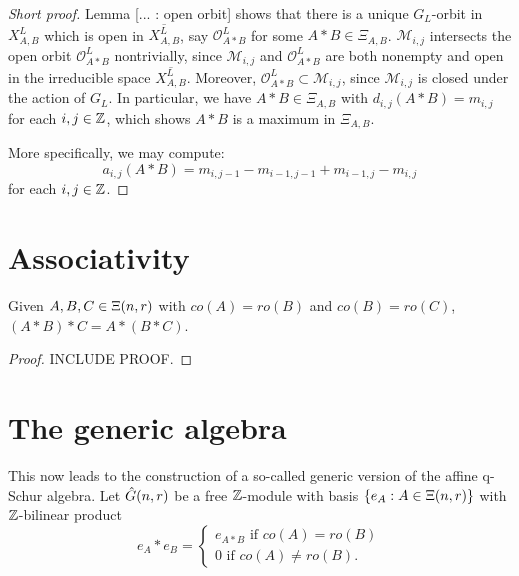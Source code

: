 \documentclass[a4paper, 11pt]{report}
\begin{document}
\begin{proof}[Short proof]
Lemma [... : open orbit] shows that there is a unique $G_L$-orbit in $X_{A,B}^L$ which is open in $\overline{X_{A,B}^L}$, say $\mathcal{O}_{A\ast B}^L$ for some $A\ast B\in\Xi_{A,B}$. $\mathcal{M}_{i,j}$ intersects the open orbit $\mathcal{O}_{A\ast B}^L$ nontrivially, since $\mathcal{M}_{i,j}$ and $\mathcal{O}_{A\ast B}^L$ are both nonempty and open in the irreducible space $\overline{X_{A,B}^L}$. Moreover, $\mathcal{O}_{A\ast B}^L\subset \mathcal{M}_{i,j}$, since $\mathcal{M}_{i,j}$ is closed under the action of $G_L$. In particular, we have $A\ast B\in \Xi_{A,B}$ with $d_{i,j}(A\ast B) = m_{i,j}$ for each $i,j\in\mathbb{Z}$, which shows $A\ast B$ is a maximum in $\Xi_{A,B}$.

More specifically, we may compute:
\begin{equation*}
a_{i,j}(A\ast B) = m_{i,j-1} - m_{i-1,j-1} + m_{i-1,j} - m_{i,j}
\end{equation*}
for each $i,j\in\mathbb{Z}$.

\end{proof}


\section{Associativity}

\begin{proposition}\label{proposition:associativity-maximum}
Given $A,B,C\in\Xi(n,r)$ with $co(A)=ro(B)$ and $co(B)=ro(C)$, $(A\ast B)\ast C = A\ast (B\ast C)$.
\end{proposition}
\begin{proof}
INCLUDE PROOF.
\end{proof}

\section{The generic algebra}

This now leads to the construction of a so-called generic version of the affine q-Schur algebra. Let $\hat{G}(n,r)$ be a free $\mathbb{Z}$-module with basis $\{e_A:A\in\Xi(n,r)\}$ with $\mathbb{Z}$-bilinear product
\begin{equation*}
e_A\ast e_B = \begin{cases}
e_{A\ast B} \text{ if } co(A)=ro(B)\\
0 \text{ if } co(A)\neq ro(B).
\end{cases}
\end{equation*}
\end{document}
